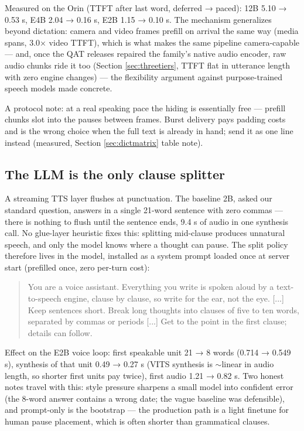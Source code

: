 \documentclass{article}
\begin{document}
Measured on the Orin (TTFT after last word, deferred → paced): 12B 5.10 → 0.53 s, E4B 2.04 → 0.16 s, E2B 1.15 → 0.10 s. The mechanism generalizes beyond dictation: camera and video frames prefill on arrival the same way (media spans, 3.0× video TTFT), which is what makes the same pipeline camera-capable — and, once the QAT releases repaired the family's native audio encoder, raw audio chunks ride it too (Section \ref{sec:threetiers}, TTFT flat in utterance length with zero engine changes) — the flexibility argument against purpose-trained speech models made concrete.

A protocol note: at a real speaking pace the hiding is essentially free — prefill chunks slot into the pauses between frames. Burst delivery pays padding costs and is the wrong choice when the full text is already in hand; send it as one line instead (measured, Section \ref{sec:dictmatrix} table note).

\subsection{The LLM is the only clause splitter}
\label{sec:clause}

A streaming TTS layer flushes at punctuation. The baseline 2B, asked our standard question, answers in a single 21-word sentence with zero commas — there is nothing to flush until the sentence ends, 9.4 s of audio in one synthesis call. No glue-layer heuristic fixes this: splitting mid-clause produces unnatural speech, and only the model knows where a thought can pause. The split policy therefore lives in the model, installed as a system prompt loaded once at server start (prefilled once, zero per-turn cost):

\begin{quote}
	You are a voice assistant. Everything you write is spoken aloud by a text-to-speech engine, clause by clause, so write for the ear, not the eye. [...] Keep sentences short. Break long thoughts into clauses of five to ten words, separated by commas or periods [...] Get to the point in the first clause; details can follow.
\end{quote}

Effect on the E2B voice loop: first speakable unit 21 → 8 words (0.714 → 0.549 s), synthesis of that unit 0.49 → 0.27 s (VITS synthesis is $\sim$linear in audio length, so shorter first units pay twice), first audio 1.21 → 0.82 s. Two honest notes travel with this: style pressure sharpens a small model into confident error (the 8-word answer contains a wrong date; the vague baseline was defensible), and prompt-only is the bootstrap — the production path is a light finetune for human pause placement, which is often shorter than grammatical clauses.
\end{document}
